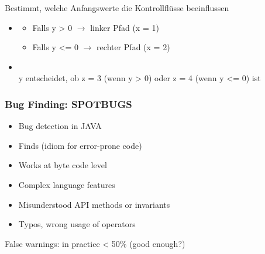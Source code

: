 \begin{infoBox}[title=Pfadabhängigkeit (Path Analysis\, PA)]
     Bestimmt, welche Anfangswerte die Kontrollflüsse beeinflussen
    \begin{itemize}
        \item {}
        \begin{itemize}
            \item Falls y > 0 $\rightarrow$ linker Pfad (x = 1)
            \item Falls y <= 0 $\rightarrow$ rechter Pfad (x = 2)
        \end{itemize}
        \item {}\\
        y entscheidet, ob z = 3 (wenn y > 0) oder z = 4 (wenn y <= 0) ist
    \end{itemize}
\end{infoBox}
\subsubsection*{Bug Finding: SPOTBUGS}
\begin{defBox}[title=SPOTBUGS (spotbugs.github.io\, successor of FindBugs)]
    \begin{itemize}
        \item Bug detection in JAVA
        \item Finds  (idiom for error-prone code)
        \item Works at byte code level
    \end{itemize}
\end{defBox}
\begin{defBox}[title=Sources for Bug Patterns]
    \begin{itemize}
        \item Complex language features
        \item Misunderstood API methods or invariants
        \item Typos, wrong usage of operators
    \end{itemize}
\end{defBox}
\begin{defBox}
    False warnings: in practice < 50\% (good enough?)
\end{defBox}
